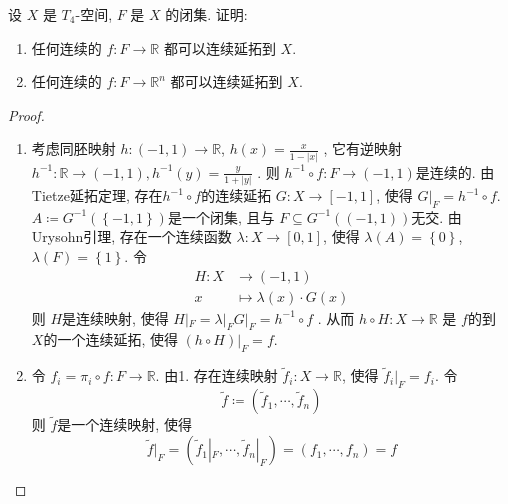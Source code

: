 \documentclass[../main.tex]{subfiles}
\begin{document}
\begin{exercise}{}{}
设 $X$ 是 $T_4$-空间, $F$ 是 $X$ 的闭集. 证明:

\begin{enumerate}
\item 任何连续的 $f: F \to \mathbb{R}$ 都可以连续延拓到 $X$.

\item 任何连续的 $f: F \to \mathbb{R}^n$ 都可以连续延拓到 $X$.
\end{enumerate}
\end{exercise}
\begin{proof}
    \begin{enumerate}
        \item 考虑同胚映射 \(  h:\left( -1,1 \right)\to \mathbb{R}    \), \(  h\left( x \right)= \frac{x }{1-\left| x \right|  }     \)   , 它有逆映射 \(  h^{-1} :\mathbb{R} \to \left( -1,1 \right), h^{-1} \left( y \right)= \frac{y }{1+ \left| y \right|  }     \) . 则 \( h^{-1} \circ f : F\to \left( -1,1 \right)   \)是连续的. 由Tietze延拓定理, 存在\(   h^{-1} \circ f   \)的连续延拓 \(  G: X\to \left[ -1,1 \right]   \), 使得 \(  G|_{F}=  h^{-1} \circ f \).  \( A\coloneqq  G^{-1} \left( \left\{ -1,1 \right\} \right)   \)是一个闭集, 且与 \(  F\subseteq  G^{-1} \left( \left( -1,1 \right)  \right)   \)无交.  由Urysohn引理, 存在一个连续函数 \(   \lambda : X\to \left[0,1 \right]  \), 使得   \(   \lambda \left( A \right)= \left\{ 0 \right\}   \),  \(   \lambda \left( F \right)= \left\{ 1 \right\}   \). 令\[
        \begin{aligned}
        H: X&\to \left( -1,1 \right)\\ 
         x&\mapsto  \lambda \left( x \right)\cdot G\left( x \right)    
        \end{aligned}
        \] 则 \(  H  \)是连续映射, 使得 \(  H|_{F}=  \lambda |_{F}G|_{F}=  h^{-1} \circ f  \)  . 从而 \(  h\circ H:X\to \mathbb{R}   \) 是 \(  f  \)的到 \(  X  \)的一个连续延拓, 使得 \(  \left( h\circ H \right)|_{F}= f   \).
        \item    令 \(  f_{i}=  \pi _{i}\circ f:F\to \mathbb{R}   \). 由1. 存在连续映射 \(  \tilde{f}_{i}:X\to \mathbb{R}   \), 使得 \(  \tilde{f}_{i}|_{F}  = f_{i}\). 令 \[
        \tilde{f}\coloneqq \left( \tilde{f}_{1},\cdots ,\tilde{f}_{n} \right) 
        \]   则 \(  \tilde{f}  \)是一个连续映射, 使得 \[
        \tilde{f}|_{F}= \left( \tilde{f}_{1}|_{F},\cdots ,\tilde{f}_{n}|_{F} \right)= \left( f_1,\cdots ,f_{n} \right)= f  
        \] 
    \end{enumerate}
    
\end{proof}
\end{document}
